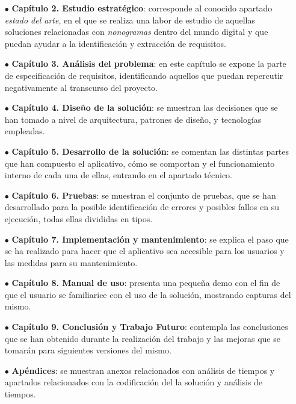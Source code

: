 \begin{itemize}
   \item[$\bullet$] \textbf{Capítulo 2. Estudio estratégico}: corresponde al conocido apartado \textit{estado del arte}, en el que se realiza una labor 
   de estudio de aquellas soluciones relacionadas con \textit{nonogramas} dentro del mundo digital y que puedan ayudar a la identificación y extracción de requisitos.
   \item[$\bullet$] \textbf{Capítulo 3. Análisis del problema}: en este capítulo se expone la parte de especificación de requisitos,
    identificando aquellos que puedan repercutir negativamente al transcurso del proyecto.
   \item[$\bullet$] \textbf{Capítulo 4. Diseño de la solución}: se muestran las decisiones que se han tomado a nivel de arquitectura, patrones de diseño, 
   y tecnologías empleadas.
   \item[$\bullet$] \textbf{Capítulo 5. Desarrollo de la solución}: se comentan las distintas partes que han compuesto el aplicativo, cómo se comportan y 
   el funcionamiento interno de cada una de ellas, entrando en el apartado técnico.
   \item[$\bullet$] \textbf{Capítulo 6. Pruebas}: se muestran el conjunto de pruebas, que se han desarrollado para la posible identificación de 
   errores y posibles fallos en su ejecución, todas ellas divididas en tipos. 
   \item[$\bullet$] \textbf{Capítulo 7. Implementación y mantenimiento}: se explica el paso que se ha realizado para hacer que el aplicativo sea accesible
   para los usuarios y las medidas para su mantenimiento. 
   \item[$\bullet$] \textbf{Capítulo 8. Manual de uso}: presenta una pequeña demo con el fin de que el usuario se familiarice con el uso de
   la solución, mostrando capturas del mismo.
   \item[$\bullet$] \textbf{Capítulo 9. Conclusión y Trabajo Futuro}: contempla las conclusiones que se han obtenido durante la realización del trabajo y
   las mejoras que se tomarán para siguientes versiones del mismo.
   \item[$\bullet$] \textbf{Apéndices}: se muestran anexos relacionados con análisis de tiempos y apartados relacionados con la codificación del
   la solución y análisis de tiempos.
\end{itemize}